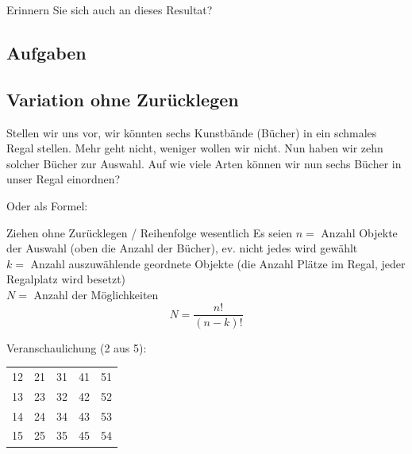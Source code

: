 Erinnern Sie sich auch an dieses Resultat? 



\subsection*{Aufgaben}
\newpage


\subsection{Variation ohne Zurücklegen}
Stellen wir uns vor, wir könnten sechs Kunstbände (Bücher) in ein schmales
Regal stellen. Mehr geht nicht, weniger wollen wir nicht.
Nun haben wir zehn solcher Bücher zur Auswahl. Auf wie viele Arten können wir nun sechs Bücher in unser Regal einordnen?


Oder als Formel:
\begin{gesetz}{Ziehen ohne Zurücklegen / Reihenfolge wesentlich}{}
Es seien
$n = $ Anzahl Objekte der Auswahl (oben die Anzahl der Bücher), ev. nicht jedes wird gewählt\\
$k = $ Anzahl auszuwählende geordnete Objekte (die Anzahl Plätze im Regal, jeder Regalplatz wird besetzt)\\
$N = $ Anzahl der Möglichkeiten\\

$$N =\frac{n!}{(n-k)!}$$
\end{gesetz}

Veranschaulichung (2 aus 5):

\begin{tabular}{c|c|c|c|c}
12 & 21 & 31 & 41 & 51\\
13 & 23 & 32 & 42 & 52\\
14 & 24 & 34 & 43 & 53\\
15 & 25 & 35 & 45 & 54\\
\end{tabular}

